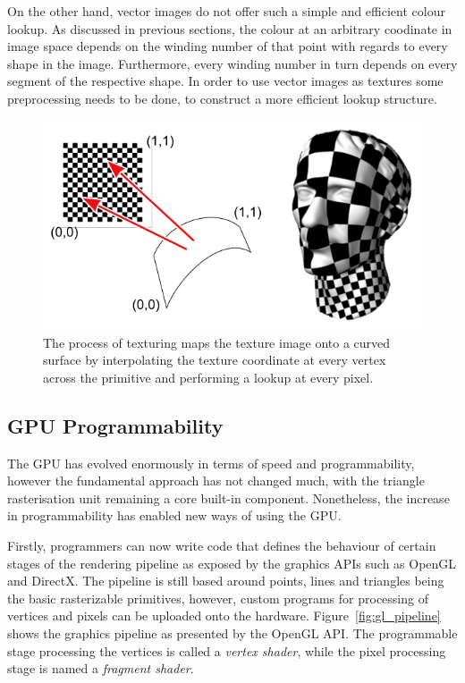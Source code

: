 \documentclass[11pt,a4paper,twoside]{article}
\begin{document}
On the other hand, vector images do not offer such a simple and efficient colour lookup. As discussed in previous sections, the colour at an arbitrary coodinate in image space depends on the winding number of that point with regards to every shape in the image. Furthermore, every winding number in turn depends on every segment of the respective shape. In order to use vector images as textures some preprocessing needs to be done, to construct a more efficient lookup structure.

\begin {figure}
	\centering
	\includegraphics [width=0.7\columnwidth]{figures/texturing}
	\caption {The process of texturing maps the texture image onto a curved surface by interpolating the texture coordinate at every vertex across the primitive and performing a lookup at every pixel.}
	\label {fig:texturing}
\end {figure}

\subsection{GPU Programmability}
The GPU has evolved enormously in terms of speed and programmability, however the fundamental approach has not changed much, with the triangle rasterisation unit remaining a core built-in component. Nonetheless, the increase in programmability has enabled new ways of using the GPU.

Firstly, programmers can now write code that defines the behaviour of certain stages of the rendering pipeline as exposed by the graphics APIs such as OpenGL and DirectX. The pipeline is still based around points, lines and triangles being the basic rasterizable primitives, however, custom programs for processing of vertices and pixels can be uploaded onto the hardware. Figure~\ref{fig:gl_pipeline} shows the graphics pipeline as presented by the OpenGL API. The programmable stage processing the vertices is called a \emph{vertex shader}, while the pixel processing stage is named a \emph{fragment shader}.
\end{document}
